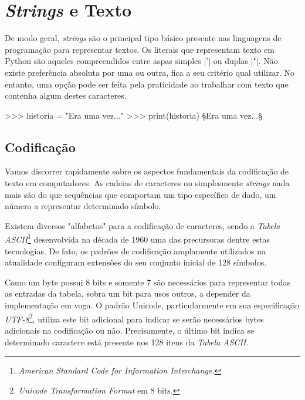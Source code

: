 \chapter[c:strings]{\textit{Strings} e Texto}
    
    De modo geral, \textit{strings} são o principal tipo básico presente nas linguagens de programação para representar textos. Os literais que representam texto em Python são aqueles compreendidos entre aspas simples |'| ou duplas |"|. Não existe preferência absoluta por uma ou outra, fica a seu critério qual utilizar. No entanto, uma opção pode ser feita pela praticidade ao trabalhar com texto que contenha algum destes caracteres.\par

    \begin{pyprompt}
        >>> historia = "Era uma vez..."
        >>> print(historia)
        §Era uma vez...§
    \end{pyprompt}

    \section*{Codificação}%
    Vamos discorrer rapidamente sobre os aspectos fundamentais da codificação de texto em computadores. As cadeias de caracteres ou simplesmente \textit{strings} nada mais são do que sequências que comportam um tipo específico de dado, um número a representar determinado símbolo.\par

    Existem diversos "alfabetos" para a codificação de caracteres, sendo a \emph{Tabela ASCII}\footnote{\textit{American Standard Code for Information Interchange.}} desenvolvida na década de 1960 uma das precursoras dentre estas tecnologias. De fato, os padrões de codificação amplamente utilizados na atualidade configuram extensões do seu conjunto inicial de 128 símbolos.\par

    Como um byte possui 8 bits e somente 7 são necessários para representar todas as entradas da tabela, sobra um bit para usos outros, a depender da implementação em voga. O padrão Unicode\cite{unicode:2020}, particularmente em sua especificação \emph{UTF-8}\footnote{\textit{Unicode Transformation Format} em 8 bits.}, utiliza este bit adicional para indicar se serão necessários bytes adicionais na codificação ou não. Precisamente, o último bit indica se determinado caractere está presente nos 128 itens da \emph{Tabela ASCII}.\par

